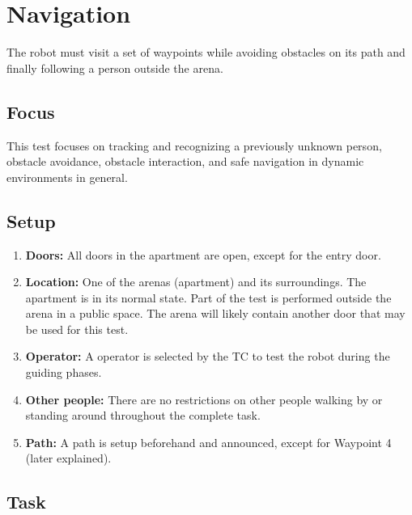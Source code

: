 \section{Navigation}
\label{test:navigation}
The robot must visit a set of waypoints while avoiding obstacles on its path and finally following a person outside the arena.

\subsection{Focus}
This test focuses on tracking and recognizing a previously unknown person, obstacle avoidance, obstacle interaction, and safe navigation in dynamic environments in general.

\subsection{Setup}

\begin{enumerate}
	\item \textbf{Doors:} All doors in the apartment are open, except for the entry door. 
	\item \textbf{Location:} One of the arenas (apartment) and its surroundings. The apartment is in its normal state. Part of the test is performed outside the arena in a public space.
	The arena will likely contain another door that may be used for this test.
	\item \textbf{Operator:} A  operator is selected by the TC to test the robot during the guiding phases.
	\item \textbf{Other people:} There are no restrictions on other people walking by or standing around throughout the complete task.
	\item \textbf{Path:} A path is setup beforehand and announced, except for Waypoint 4 (later explained).
\end{enumerate}

\subsection{Task}
%
%

